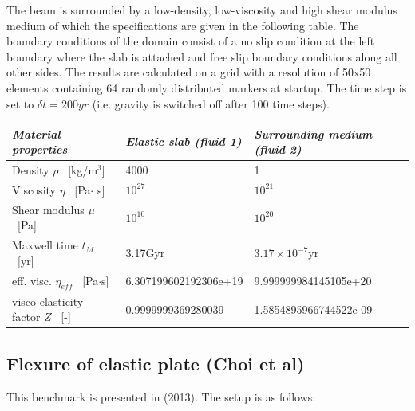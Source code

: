 The beam is surrounded by a low-density, low-viscosity and high shear modulus medium
of which the specifications are given in  the following table.
The boundary conditions of the domain consist of a no slip condition at
the left boundary where the slab is attached and free slip boundary conditions along all other sides.
The results are calculated on a grid with a resolution of 50x50 elements containing 64 randomly distributed markers at startup.
The time step is set to $\delta t = 200yr$ (i.e. gravity is switched off after 100 time steps).

\begin{center}
\begin{tabular}{lll}
\hline
\textit{Material properties}& \textit{Elastic slab (fluid 1)}  & \textit{Surrounding medium (fluid 2)} \\
\hline
\hline
Density         $\rho$ \     [kg/m$^{3}$]      & 4000                    & 1     \\
Viscosity       $\eta$ \    [Pa$\cdot$ s]      & $10^{27}$               &   $10^{21}$     \\
Shear modulus   $\mu $ \    [Pa]               & $10^{10}$               & $10^{20}$       \\
Maxwell time $t_M$     \    [yr]               & 3.17Gyr                 &  $3.17\times10^{-7}$yr       \\
eff. visc.      $\eta_{eff}$ \ [Pa$\cdot$s]    & 6.307199602192306e+19   &  9.999999984145105e+20      \\
visco-elasticity factor $Z$      \ [-]         & 0.9999999369280039      &  1.5854895966744522e-09     \\
\hline
\end{tabular}
\end{center}








\subsection{Flexure of elastic plate (Choi et al) \label{sec:chtl13}}


This benchmark is presented in \textcite{chtl13} (2013). 
The setup is as follows:

